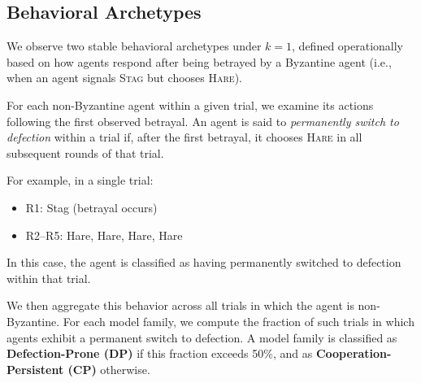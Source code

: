\documentclass[runningheads]{llncs}
\newcommand{\tsc}[1]{\textsc{#1}}
\begin{document}
\subsection{Behavioral Archetypes}







We observe two stable behavioral archetypes under $k{=}1$, defined operationally based on how agents respond after being betrayed by a Byzantine agent (i.e., when an agent signals \tsc{Stag} but chooses \tsc{Hare}).

For each non-Byzantine agent within a given trial, we examine its actions following the first observed betrayal. An agent is said to \emph{permanently switch to defection} within a trial if, after the first betrayal, it chooses \tsc{Hare} in all subsequent rounds of that trial.

For example, in a single trial:
\begin{itemize}
    \item R1: Stag (betrayal occurs)
    \item R2--R5: Hare, Hare, Hare, Hare
\end{itemize}
In this case, the agent is classified as having permanently switched to defection within that trial.

We then aggregate this behavior across all trials in which the agent is non-Byzantine. For each model family, we compute the fraction of such trials in which agents exhibit a permanent switch to defection. A model family is classified as \textbf{Defection-Prone (DP)} if this fraction exceeds 50\%, and as \textbf{Cooperation-Persistent (CP)} otherwise.
\end{document}

